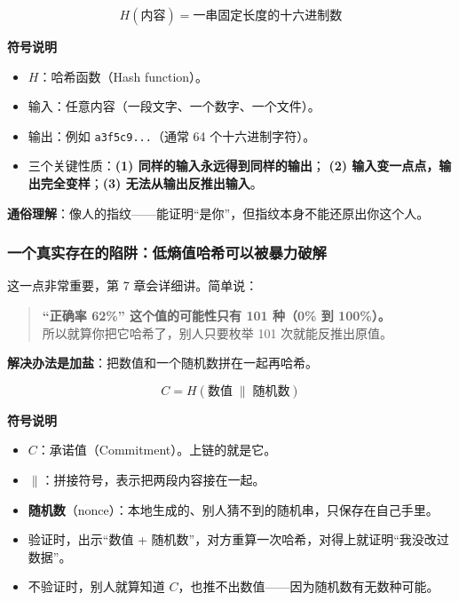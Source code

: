 \documentclass[UTF8,a4paper,11pt]{ctexart}
\newenvironment{explainbox}[1]
{\begin{center}\begin{minipage}{0.94\textwidth}\colorbox{boxbg}{\parbox{0.92\textwidth}{\textbf{#1}\par\vspace{2pt}}}}
{\end{minipage}\end{center}}
\newcommand{\sym}[1]{\texttt{#1}}
\newcommand{\hl}[1]{\textcolor{blue!70!black}{\textbf{#1}}}
\begin{document}
\begin{equation}
H(\text{内容}) = \text{一串固定长度的十六进制数}
\end{equation}

\begin{explainbox}{符号说明}
\begin{itemize}[leftmargin=1.4em,itemsep=1pt]
\item $H$：哈希函数（Hash function）。
\item 输入：任意内容（一段文字、一个数字、一个文件）。
\item 输出：例如 \sym{a3f5c9...}（通常 64 个十六进制字符）。
\item 三个关键性质：\textbf{(1) 同样的输入永远得到同样的输出}；
      \textbf{(2) 输入变一点点，输出完全变样}；\textbf{(3) 无法从输出反推出输入}。
\end{itemize}
\end{explainbox}

\textbf{通俗理解}：像人的指纹——能证明“是你”，但指纹本身不能还原出你这个人。

\subsubsection{一个真实存在的陷阱：低熵值哈希可以被暴力破解}

这一点非常重要，第 7 章会详细讲。简单说：

\begin{quote}
\textbf{“正确率 62\%” 这个值的可能性只有 101 种（0\% 到 100\%）。}\\
所以就算你把它哈希了，别人只要枚举 101 次就能反推出原值。
\end{quote}

\hl{解决办法是加盐}：把数值和一个随机数拼在一起再哈希。

\begin{equation}
C = H(\text{数值} \;\|\; \text{随机数})
\end{equation}

\begin{explainbox}{符号说明}
\begin{itemize}[leftmargin=1.4em,itemsep=1pt]
\item $C$：承诺值（Commitment）。上链的就是它。
\item $\|$：拼接符号，表示把两段内容接在一起。
\item \textbf{随机数}（nonce）：本地生成的、别人猜不到的随机串，只保存在自己手里。
\item 验证时，出示“数值 + 随机数”，对方重算一次哈希，对得上就证明“我没改过数据”。
\item 不验证时，别人就算知道 $C$，也推不出数值——因为随机数有无数种可能。
\end{itemize}
\end{explainbox}
\end{document}
